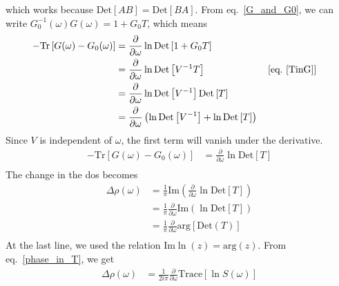 which works because \(\text{Det}\left[ A B \right] = \text{Det}\left[BA\right]\). From eq.~\ref{G_and_G0}, we can write \(G_0^{-1}(\omega)G(\omega) = 1 + G_0T\), which means
\begin{equation}\begin{aligned}
	-\text{Tr}\left[G(\omega) - G_0(\omega)\right] &= \frac{\partial{}}{\partial{\omega}} \ln \text{Det}\left[1 + G_0T\right]\\
						       &= \frac{\partial{}}{\partial{\omega}} \ln \text{Det}\left[V^{-1}T\right] && \left[ \text{eq.~\ref{TinG}} \right] \\ 
						       &= \frac{\partial{}}{\partial{\omega}} \ln \text{Det}\left[V^{-1}\right]\text{Det}\left[T\right]\\ 
						       &= \frac{\partial{}}{\partial{\omega}} \left(\ln \text{Det}\left[V^{-1}\right] + \ln \text{Det}\left[T\right]\right)\\ 
\end{aligned}\end{equation}
Since \(V\) is independent of \(\omega\), the first term will vanish under the derivative.
\begin{equation}\begin{aligned}
	-\text{Tr}\left[G(\omega) - G_0(\omega)\right] &= \frac{\partial{}}{\partial{\omega}} \ln \text{Det}\left[T\right]\\ 
\end{aligned}\end{equation}
The change in the dos becomes
\begin{equation}\begin{aligned}
	\Delta \rho(\omega) &= \frac{1}{\pi}\text{Im}\left( \frac{\partial{}}{\partial{\omega}} \ln \text{Det}\left[T\right]\right)\\
&= \frac{1}{\pi}\frac{\partial{}}{\partial{\omega}} \text{Im}\left( \ln \text{Det}\left[T\right]\right)\\
&= \frac{1}{\pi}\frac{\partial{}}{\partial{\omega}} \text{arg} \left[\text{Det}\left(T\right)\right]\\
\end{aligned}\end{equation}
At the last line, we used the relation \(\text{Im} \ln (z) = \text{arg}(z)\). From eq.~\ref{phase_in_T}, we get
\begin{equation}\begin{aligned}
	\Delta \rho(\omega) &= \frac{1}{2i\pi}\frac{\partial{}}{\partial{\omega}} \text{Trace}\left[\ln S(\omega)\right]\\
\end{aligned}\end{equation}
